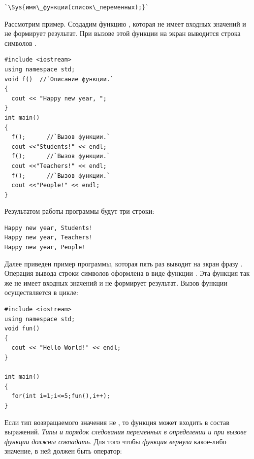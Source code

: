 \begin{lstlisting}
`\Sys{имя\_функции(список\_переменных);}`
\end{lstlisting}

Рассмотрим пример. Создадим функцию , которая не имеет входных значений и не формирует результат.
При вызове этой функции на экран выводится строка символов .

\begin{lstlisting}
#include <iostream>
using namespace std;
void f()  //`Описание функции.`
{
  cout << "Happy new year, ";
}
int main()
{
  f();      //`Вызов функции.`
  cout <<"Students!" << endl;
  f();      //`Вызов функции.`
  cout <<"Teachers!" << endl;
  f();      //`Вызов функции.`
  cout <<"People!" << endl;
}
\end{lstlisting}

Результатом работы программы будут три строки:
\begin{verbatim}
Happy new year, Students!
Happy new year, Teachers!
Happy new year, People!
\end{verbatim}

Далее приведен пример программы, которая пять раз выводит на экран фразу . Операция вывода строки символов оформлена в виде функции . Эта функция так же
не имеет входных значений и не формирует результат. Вызов функции осуществляется в цикле:
\begin{lstlisting}
#include <iostream>
using namespace std;
void fun()
{
  cout << "Hello World!" << endl;
}

int main()
{
  for(int i=1;i<=5;fun(),i++);
}
\end{lstlisting}

Если тип возвращаемого значения не , то функция может входить в состав выражений.
\emph{Типы и порядок следования переменных в определении и при вызове функции должны совпадать}. Для того
чтобы \emph{функция вернула} какое-либо значение, в ней должен быть
оператор: 


